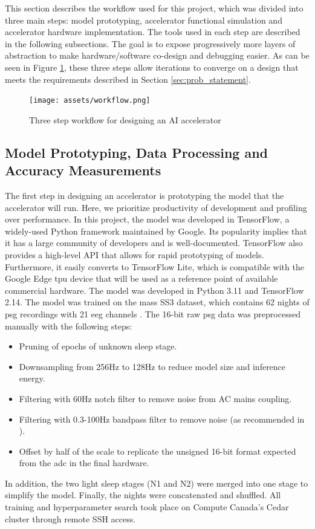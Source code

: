 This section describes the workflow used for this project, which was divided into three main steps: model prototyping, accelerator functional simulation and accelerator hardware implementation.
The tools used in each step are described in the following subsections. The goal is to expose progressively more layers of abstraction to make hardware/software co-design and debugging easier. As
can be seen in Figure \ref{fig:workflow_plan}, these three steps allow iterations to converge on a design that meets the requirements described in Section \ref{sec:prob_statement}.
\begin{figure}[H]
    \centering
    \caption{Three step workflow for designing an AI accelerator}
    \texttt{[image: assets/workflow.png]}
    \label{fig:workflow_plan}
\end{figure}

\subsection{Model Prototyping, Data Processing and Accuracy Measurements}
The first step in designing an accelerator is prototyping the model that the accelerator will run. Here, we prioritize productivity of development and profiling over performance. In this project,
the model was developed in TensorFlow, a widely-used Python framework maintained by Google. Its popularity implies that it has a large community of developers and is well-documented. TensorFlow
also provides a high-level API that allows for rapid prototyping of models. Furthermore, it easily converts to TensorFlow Lite, which is compatible with the Google Edge \ac{tpu} device that will
be used as a reference point of available commercial hardware. The model was developed in Python 3.11 and TensorFlow 2.14. The model was trained on the \ac{mass} SS3 dataset, which contains 62
nights of \ac{psg} recordings with 21 \ac{eeg} channels \cite*{SP3/9MYUCS_2022}. The 16-bit raw \ac{psg} data was preprocessed manually with the following steps:
\begin{itemize}
    \item Pruning of epochs of unknown sleep stage.
    \item Downsampling from 256Hz to 128Hz to reduce model size and inference energy.
    \item Filtering with 60Hz notch filter to remove noise from AC mains coupling.
    \item Filtering with 0.3-100Hz bandpass filter to remove noise (as recommended in \cite{supratak2017deepsleepnet}).
    \item Offset by half of the scale to replicate the unsigned 16-bit format expected from the \ac{adc} in the final hardware.
\end{itemize}
In addition, the two light sleep stages (N1 and N2) were merged into one stage to simplify the model. Finally, the nights were concatenated and shuffled.
All training and hyperparameter search took place on Compute Canada's Cedar cluster through remote SSH access.

